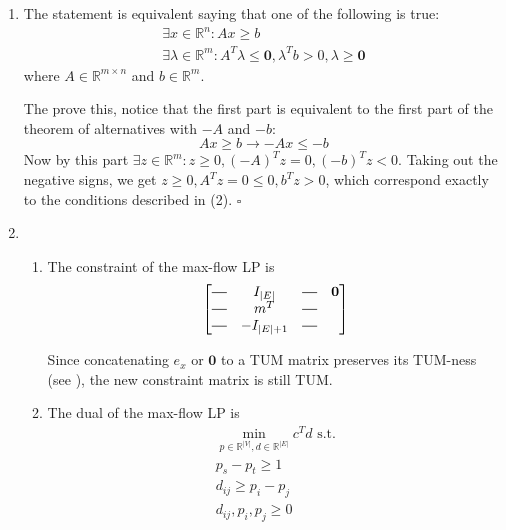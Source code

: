 \documentclass[12pt]{article}
\newcommand*{\horzbar}{\rule[.5ex]{2.5ex}{0.5pt}}
\begin{document}
\begin{enumerate}
      \item The statement is equivalent saying that one of the following is true:
            \begin{gather}
                  \exists x \in \mathbb{R}^n: Ax \ge b \\
                  \exists \lambda \in \mathbb{R}^m: A^T \lambda \le \mathbf{0}, \lambda^Tb > 0, \lambda \ge \mathbf{0}
            \end{gather}
            where $A \in \mathbb{R}^{m \times n}$ and $b \in \mathbb{R}^m$.

            The prove this, notice that the first part is equivalent to the first
            part of the theorem of alternatives with $-A$ and $-b$:
            \[Ax \ge b \rightarrow -Ax \le -b\]
            Now by this part $\exists z \in \mathbb{R}^m: z \ge 0, (-A)^Tz = 0, (-b)^Tz < 0$.
            Taking out the negative signs, we get $z \ge 0, A^Tz=0 \le 0, b^Tz > 0$,
            which correspond exactly to the conditions described in (2). $\square$

      \item \begin{enumerate}
                  \item The constraint of the max-flow LP is
                        \[\begin{bmatrix}
                                    \horzbar & I_{|E|}    & \horzbar & \mathbf{0} \\
                                    \horzbar & m^T        & \horzbar              \\
                                    \horzbar & -I_{|E|+1} & \horzbar
                              \end{bmatrix}\]

                        Since concatenating $e_x$ or $\mathbf{0}$ to a TUM matrix preserves its TUM-ness
                        (see \href{https://math.stackexchange.com/a/3618732/713952}{\color{blue}{here}}),
                        the new constraint matrix is still TUM.

                  \item The dual of the max-flow LP is
                        \begin{gather*}
                              \min_{p \in \mathbb{R}^{|V|}, d \in \mathbb{R}^{|E|}} c^Td \text{ s.t.} \\
                              p_s - p_t \ge 1 \\
                              d_{ij} \ge p_i - p_j \\
                              d_{ij}, p_i, p_j \ge 0
                        \end{gather*}


\end{enumerate}
\end{enumerate}
\end{document}
